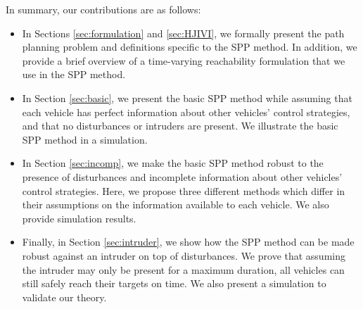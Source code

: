 In summary, our contributions are as follows:
\begin{itemize}
\item In Sections \ref{sec:formulation} and \ref{sec:HJIVI}, we formally present the path planning problem and definitions specific to the SPP method. In addition, we provide a brief overview of a time-varying reachability formulation that we use in the SPP method.
\item In Section \ref{sec:basic}, we present the basic SPP method while assuming that each vehicle has perfect information about other vehicles' control strategies, and that no disturbances or intruders are present. We illustrate the basic SPP method in a simulation.
\item In Section \ref{sec:incomp}, we make the basic SPP method robust to the presence of disturbances and incomplete information about other vehicles' control strategies. Here, we propose three different methods which differ in their assumptions on the information available to each vehicle. We also provide simulation results.
\item Finally, in Section \ref{sec:intruder}, we show how the SPP method can be made robust against an intruder on top of disturbances. We prove that assuming the intruder may only be present for a maximum duration, all vehicles can still safely reach their targets on time. We also present a simulation to validate our theory.
\end{itemize}
